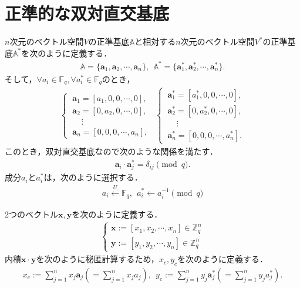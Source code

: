 \documentclass[a4paper]{jsarticle}
\begin{document}
\section{正準的な双対直交基底}
$n$次元のベクトル空間$V$の正準基底$\mathbb{A}$と相対する$n$次元のベクトル空間$V^*$の正準基底$\mathbb{A}^*$を次のように定義する．
\begin{align}
\mathbb{A} = \{ \bm{a}_1, \bm{a}_2, \cdots, \bm{a}_n \},\ \ 
\mathbb{A}^* = \{ \bm{a}^*_1, \bm{a}^*_2, \cdots, \bm{a}^*_n \}.
\end{align}
そして，$\forall a_i\in\mathbb{F}_q, \forall a^*_i\in\mathbb{F}_q$のとき，
\begin{align}
\begin{cases}
\ \bm{a}_1 = [a_1,0,0,\cdots,0],\\
\ \bm{a}_2 = [0,a_2,0,\cdots,0],\\
\ \ \ \ \ \ \vdots\\
\ \bm{a}_n = [0,0,0,\cdots,a_n],
\end{cases}\ \ 
\begin{cases}
\ \bm{a}^*_1 = [a^*_1,0,0,\cdots,0],\\
\ \bm{a}^*_2 = [0,a^*_2,0,\cdots,0],\\
\ \ \ \ \ \ \vdots\\
\ \bm{a}^*_n = [0,0,0,\cdots,a^*_n].
\end{cases}
\end{align}
このとき，双対直交基底なので次のような関係を満たす．
\begin{align}
\bm{a}_i\cdot \bm{a}^*_j = \delta_{ij}\pmod{q}.
\end{align}
成分$a_i$と$a_i^*$は，次のように選択する．
\begin{align}
a_i\overset{U}{\leftarrow} \mathbb{F}_q,\ \  a_i^*\leftarrow a_i^{-1}\pmod{q}
\end{align}


2つのベクトル$\bm{x},\bm{y}$を次のように定義する．
\begin{align}
\begin{cases}
\bm{x} := [x_1, x_2,\cdots,x_n]\in \mathbb{Z}_q^n\\
\bm{y} := [y_1, y_2,\cdots, y_n]\in \mathbb{Z}_q^n
\end{cases}
\end{align}
内積$\bm{x}\cdot\bm{y}$を次のように秘匿計算するため，$x_c,y_c$を次のように定義する．
\begin{align}
x_c := \displaystyle\sum_{j=1}^n x_j\bm{a}_j \left(= \sum_{j=1}^n x_ja_j\right),\ \ 
y_c := \displaystyle\sum_{j=1}^n y_j\bm{a}^*_j \left(= \sum_{j=1}^n y_ja^*_j\right).
\end{align}
\end{document}

